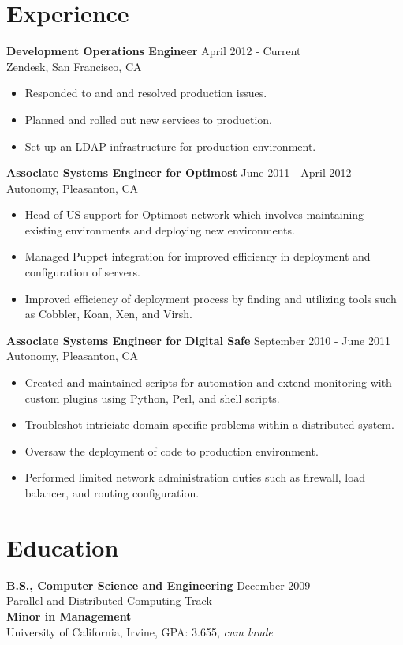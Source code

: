 \documentclass[10pt,line,margin,letterpaper]{res}
\begin{document}
\begin{resume}
\section{Experience}
    {\bf Development Operations Engineer} \hfill April 2012 - Current\\
    Zendesk, San Francisco, CA
    \begin{itemize} \itemsep -2pt
    \item Responded to and and resolved production issues.
    \item Planned and rolled out new services to production.
    \item Set up an LDAP infrastructure for production environment.
    \end{itemize}
    
    {\bf Associate Systems Engineer for Optimost} \hfill June 2011 - April 2012 \\
    Autonomy, Pleasanton, CA
    \begin{itemize} \itemsep -2pt
    \item Head of US support for Optimost network which involves maintaining existing environments and deploying new environments.
    \item Managed Puppet integration for improved efficiency in deployment and configuration of servers.
    \item Improved efficiency of deployment process by finding and utilizing tools such as Cobbler, Koan, Xen, and Virsh.
    \end{itemize}

    {\bf Associate Systems Engineer for Digital Safe} \hfill September 2010 - June 2011 \\
    Autonomy, Pleasanton, CA
    \begin{itemize} \itemsep -2pt
    \item Created and maintained scripts for automation and extend monitoring with custom plugins using Python, Perl, and shell scripts.
    \item Troubleshot intriciate domain-specific problems within a distributed system.
    \item Oversaw the deployment of code to production environment.
    \item Performed limited network administration duties such as firewall, load balancer, and routing configuration.
    \end{itemize}

\section{Education}
    {\bf B.S., Computer Science and Engineering} \hfill December 2009 \\
    Parallel and Distributed Computing Track \\
    {\bf Minor in Management} \\
    University of California, Irvine, GPA: 3.655, \textit{cum laude}


\end{resume}
\end{document}
